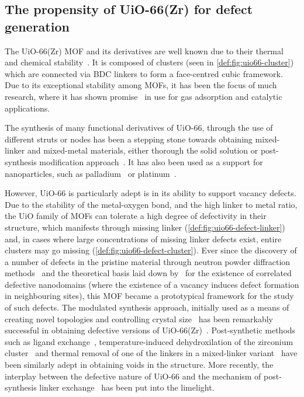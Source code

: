 \subsection{The propensity of UiO-66(Zr) for defect generation}

The UiO-66(Zr) \gls{MOF} and its derivatives are well known due to
their thermal and chemical stability~\cite{cavkaNewZirconiumInorganic2008}.
It is composed of  clusters
(seen in \autoref{def:fig:uio66-cluster}) which are connected
via \gls{BDC} linkers to form a face-centred cubic
framework. Due to its exceptional stability among \glspl{MOF}, it has been the
focus of much research, where it has shown
promise~\cite{wiersumEvaluationUiO66GasBased2011} in use for gas
adsorption and catalytic applications.

The synthesis of many functional derivatives of UiO-66,
through the use of different struts or nodes has been a stepping 
stone towards obtaining mixed-linker and mixed-metal materials, 
either thorough the solid solution or post-synthesis modification
approach~\cite{kimPostsyntheticLigandExchange2012}.
It has also been used as a support for nanoparticles, such
as palladium~\cite{shenHighlyDispersedPalladium2013}
or platinum~\cite{oienProbingReactivePlatinum2015}.

However, UiO-66 is particularly adept is in its ability to support
vacancy defects. Due to the stability of the metal-oxygen bond, and the
high linker to metal ratio, the UiO family of \glspl{MOF} can tolerate
a high degree of defectivity in their structure, which manifests through
missing linker (\autoref{def:fig:uio66-defect-linker}) and, in cases where
large concentrations of missing linker defects exist, entire
clusters may go missing (\autoref{def:fig:uio66-defect-cluster}).
Ever since the discovery of a number of
defects in the pristine material through neutron powder diffraction
methods~\cite{wuUnusualHighlyTunable2013} and the theoretical
basis laid down by~\citet{cliffeCorrelatedDefectNanoregions2014}
for the existence of correlated defective nanodomains (where the
existence of a vacancy induces defect formation in neighbouring
sites), this \gls{MOF} became a prototypical framework for the study of
such defects.
The modulated synthesis approach, initially used as
a means of creating novel topologies and controlling crystal
size~\cite{guillermZirconiumMethacrylateOxocluster2010}
has been remarkably successful in obtaining defective versions
of UiO-66(Zr)~\cite{shearerDefectEngineeringTuning2016}.
Post-synthetic methods such as ligand
exchange~\cite{shearerFunctionalizingDefectsPostsynthetic2016},
temperature-induced dehydroxilation of the zirconium
cluster~\cite{valenzanoDisclosingComplexStructure2011} and
thermal removal of one of the linkers in a mixed-linker
variant~\cite{buekenTacklingDefectConundrum2017} have been
similarly adept in obtaining voids in the structure.
More recently, the interplay between the 
defective nature of UiO-66 and the mechanism of 
post-synthesis linker exchange~\cite{taddeiPostsyntheticLigandExchange2018}
has been put into the limelight.


